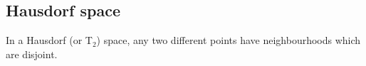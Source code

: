 
\subsection{Hausdorf space}

In a Hausdorf (or T\(_2\)) space, any two different points have neighbourhoods which are disjoint.

